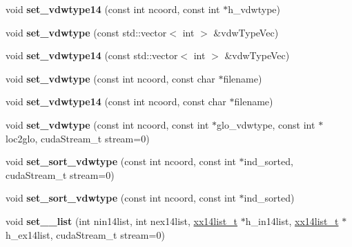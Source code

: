 \begin{DoxyCompactItemize}
\item 
\hypertarget{classCudaPMEDirectForce_aa4632a6554912cb8097490e173172297}{}\label{classCudaPMEDirectForce_aa4632a6554912cb8097490e173172297} 
void {\bfseries set\+\_\+vdwtype14} (const int ncoord, const int $\ast$h\+\_\+vdwtype)
\item 
\hypertarget{classCudaPMEDirectForce_a8a9e4398177e64104eea3575f4ab8abb}{}\label{classCudaPMEDirectForce_a8a9e4398177e64104eea3575f4ab8abb} 
void {\bfseries set\+\_\+vdwtype} (const std\+::vector$<$ int $>$ \&vdw\+Type\+Vec)
\item 
\hypertarget{classCudaPMEDirectForce_a264e8631ff714bfd94ffd4f7419d2e23}{}\label{classCudaPMEDirectForce_a264e8631ff714bfd94ffd4f7419d2e23} 
void {\bfseries set\+\_\+vdwtype14} (const std\+::vector$<$ int $>$ \&vdw\+Type\+Vec)
\item 
\hypertarget{classCudaPMEDirectForce_a2dbd53823bcfcf2b4c400c1d50858505}{}\label{classCudaPMEDirectForce_a2dbd53823bcfcf2b4c400c1d50858505} 
void {\bfseries set\+\_\+vdwtype} (const int ncoord, const char $\ast$filename)
\item 
\hypertarget{classCudaPMEDirectForce_ae86a0371b56d11a043eae628adeaff11}{}\label{classCudaPMEDirectForce_ae86a0371b56d11a043eae628adeaff11} 
void {\bfseries set\+\_\+vdwtype14} (const int ncoord, const char $\ast$filename)
\item 
\hypertarget{classCudaPMEDirectForce_a156c597a81b36f606ae6ec678ee9d5d1}{}\label{classCudaPMEDirectForce_a156c597a81b36f606ae6ec678ee9d5d1} 
void {\bfseries set\+\_\+vdwtype} (const int ncoord, const int $\ast$glo\+\_\+vdwtype, const int $\ast$loc2glo, cuda\+Stream\+\_\+t stream=0)
\item 
\hypertarget{classCudaPMEDirectForce_a2f5d54d2fb17ceb9512f986068cba56f}{}\label{classCudaPMEDirectForce_a2f5d54d2fb17ceb9512f986068cba56f} 
void {\bfseries set\+\_\+sort\+\_\+vdwtype} (const int ncoord, const int $\ast$ind\+\_\+sorted, cuda\+Stream\+\_\+t stream=0)
\item 
\hypertarget{classCudaPMEDirectForce_a5e2f4c3126ce4b98f6ce2e5e74be5f0d}{}\label{classCudaPMEDirectForce_a5e2f4c3126ce4b98f6ce2e5e74be5f0d} 
void {\bfseries set\+\_\+sort\+\_\+vdwtype} (const int ncoord, const int $\ast$ind\+\_\+sorted)
\item 
\hypertarget{classCudaPMEDirectForce_ae52a39ad11c3d644a8ce9075e99dc2c2}{}\label{classCudaPMEDirectForce_ae52a39ad11c3d644a8ce9075e99dc2c2} 
void {\bfseries set\+\_\+\_\+list} (int nin14list, int nex14list, \hyperlink{structxx14list__t}{xx14list\+\_\+t} $\ast$h\+\_\+in14list, \hyperlink{structxx14list__t}{xx14list\+\_\+t} $\ast$h\+\_\+ex14list, cuda\+Stream\+\_\+t stream=0)

\end{DoxyCompactItemize}
